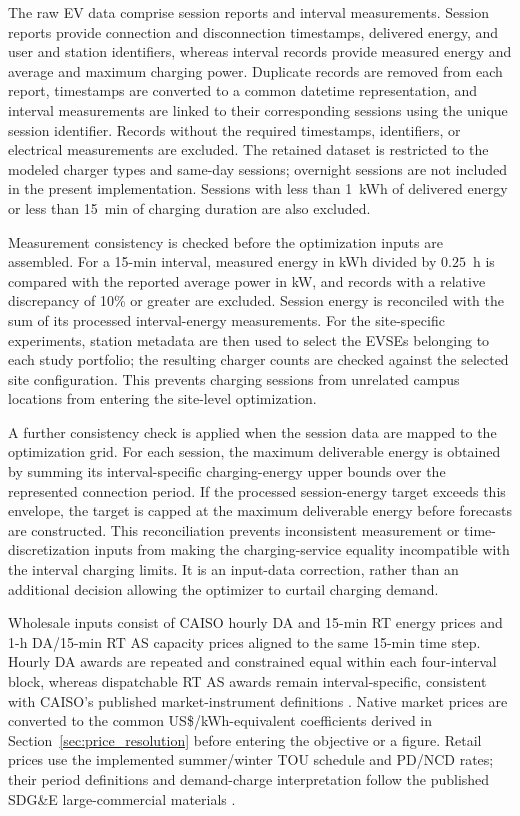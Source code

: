 \documentclass[final,5p,times]{elsarticle}
\begin{document}
The raw EV data comprise session reports and interval
measurements. Session reports provide connection and
disconnection timestamps, delivered energy, and user and
station identifiers, whereas interval records provide measured
energy and average and maximum charging power. Duplicate
records are removed from each report, timestamps are converted
to a common datetime representation, and interval measurements
are linked to their corresponding sessions using the unique
session identifier. Records without the required timestamps,
identifiers, or electrical measurements are excluded. The
retained dataset is restricted to the modeled charger types
and same-day sessions; overnight sessions are not included in
the present implementation. Sessions with less than
1~kWh of delivered energy or less than 15~min of charging
duration are also excluded.

Measurement consistency is checked before the optimization
inputs are assembled. For a 15-min interval, measured energy
in kWh divided by $0.25$~h is compared with the reported
average power in kW, and records with a relative discrepancy
of 10\% or greater are excluded. Session energy is reconciled
with the sum of its processed interval-energy measurements.
For the site-specific experiments, station metadata are then
used to select the EVSEs belonging to each study portfolio;
the resulting charger counts are checked against the selected
site configuration. This prevents charging sessions from
unrelated campus locations from entering the site-level
optimization.

A further consistency check is applied when the session data
are mapped to the optimization grid. For each session, the
maximum deliverable energy is obtained by summing its
interval-specific charging-energy upper bounds over the
represented connection period. If the processed session-energy
target exceeds this envelope, the target is capped at the
maximum deliverable energy before forecasts are constructed.
This reconciliation prevents inconsistent measurement or
time-discretization inputs from making the charging-service
equality incompatible with the interval charging limits.
It is an input-data correction, rather than an additional
decision allowing the optimizer to curtail charging demand.

Wholesale inputs consist of CAISO hourly DA and 15-min RT energy prices and 1-h DA/15-min RT AS capacity prices aligned to the same 15-min time step. Hourly DA awards are
repeated and constrained equal within each four-interval block, whereas dispatchable RT AS awards remain interval-specific, consistent with CAISO's published market-instrument definitions \cite{caisoMarketInstruments2026,caisoMarketOperations2026}.
Native market prices are converted to the common US\$/kWh-equivalent coefficients derived in Section~\ref{sec:price_resolution} before entering the
objective or a figure. Retail prices use the implemented summer/winter TOU schedule and PD/NCD rates; their period definitions and demand-charge interpretation follow the published SDG\&E large-commercial materials \cite{sdgeLargeCommercial2025,sdgeDemandGuide2026}.
\end{document}
